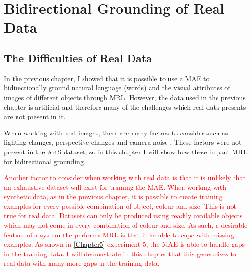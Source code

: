 
\chapter{Bidirectional Grounding of Real Data} %

\label{Chapter6} %


\section{The Difficulties of Real Data}
In the previous chapter, I showed that it is possible to use a \ac{MAE} to bidirectionally ground natural language (words) and the visual attributes of images of different objects through \ac{MRL}. However, the data used in the previous chapter is artificial and therefore many of the challenges which real data presents are not present in it. 

When working with real images, there are many factors to consider such as lighting changes, perspective changes and camera noise \cite{keller2016analysis}. These factors were not present in the ArtS dataset, so in this chapter I will show how these impact \ac{MRL} for bidirectional grounding.

\textcolor{red}{Another factor to consider when working with real data is that it is unlikely that an exhaustive dataset will exist for training the \ac{MAE}. When working with synthetic data, as in the previous chapter, it is possible to create training examples for every possible combination of object, colour and size. This is not true for real data. Datasets can only be produced using readily available objects which may not come in every combination of colour and size. As such, a desirable feature of a system the performs \ac{MRL} is that it be able to cope with missing examples. As shown in \autoref{Chapter5} experiment 5, the \ac{MAE} is able to handle gaps in the training data. I will demonstrate in this chapter that this generalises to real data with many more gaps in the training data.}



